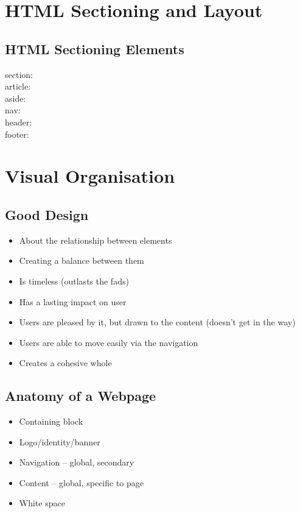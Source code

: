 \section{HTML Sectioning and Layout}
\subsection{HTML Sectioning Elements}
\begin{description}
	\item[section:]
	\item[article:]
	\item[aside:]
	\item[nav:]
	\item[header:]
	\item[footer:]	
\end{description}

\section{Visual Organisation}
\subsection{Good Design}
\begin{itemize}
	\item About the relationship between elements
	\item Creating a balance between them
	\item Is timeless (outlasts the fads)
	\item Has a lasting impact on user
	\item Users are pleased by it, but drawn to the content (doesn't get in the way)
	\item Users are able to move easily via the navigation
	\item Creates a cohesive whole	
\end{itemize}

\subsection{Anatomy of a Webpage}
\begin{itemize}
	\item Containing block
	\item Logo/identity/banner
	\item Navigation -- global, secondary
	\item Content -- global, specific to page
	\item White space	
\end{itemize}

